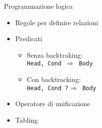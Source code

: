 \iffalse
Della programmazione logica troviamo delle caratterisctiche tipiche come la possibilità di definire le relazioni, la possibilità di definire predicati e di farne backtracking (quindi abbiamo il non determinismo) ed infine è presente l'operatore di unificazione.

*** AGGIUNGERE ESEMPI ***
\fi

\begin{frame}[fragile]{Programmazione logica}

	\begin{itemize}
		\item Regole per definire relazioni
		\item Predicati
			\begin{itemize}
				\item Senza backtraking: \\\hspace{1cm} \texttt{Head, Cond $\Rightarrow$ Body}
				\item Con backtracking: \\\hspace{1cm} \texttt{Head, Cond ?$\Rightarrow$ Body}
			\end{itemize}
		\item Operatore di unificazione
		\item Tabling
	\end{itemize}

\end{frame}